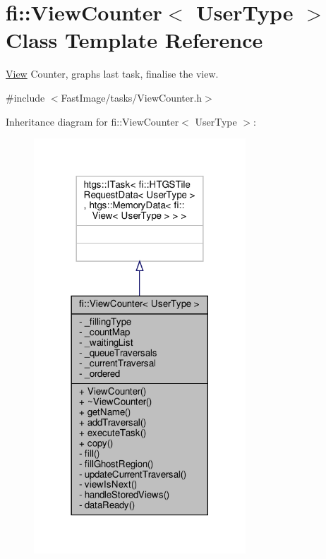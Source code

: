 \hypertarget{classfi_1_1ViewCounter}{}\section{fi\+:\+:View\+Counter$<$ User\+Type $>$ Class Template Reference}
\label{classfi_1_1ViewCounter}


\hyperlink{classfi_1_1View}{View} Counter, graph\textquotesingle{}s last task, finalise the view.  




{\ttfamily \#include $<$Fast\+Image/tasks/\+View\+Counter.\+h$>$}



Inheritance diagram for fi\+:\+:View\+Counter$<$ User\+Type $>$\+:
\nopagebreak
\begin{figure}[H]
\begin{center}
\leavevmode
\includegraphics[width=225pt]{d9/d57/classfi_1_1ViewCounter__inherit__graph}
\end{center}
\end{figure}


